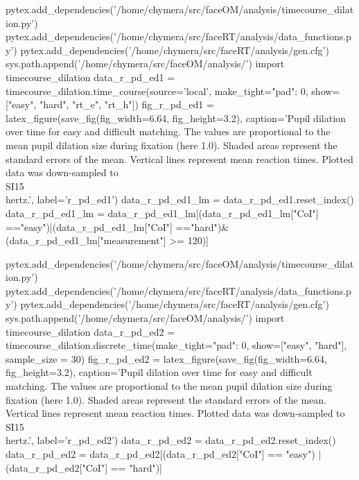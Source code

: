 \begin{pycode}[r_pd_ed1]
pytex.add_dependencies('/home/chymera/src/faceOM/analysis/timecourse_dilation.py')
pytex.add_dependencies('/home/chymera/src/faceRT/analysis/data_functions.py')
pytex.add_dependencies('/home/chymera/src/faceRT/analysis/gen.cfg')
sys.path.append('/home/chymera/src/faceOM/analysis/')
import timecourse_dilation
data_r_pd_ed1 = timecourse_dilation.time_course(source='local', make_tight={"pad": 0}, show=["easy", "hard", "rt_e", "rt_h"])
fig_r_pd_ed1 = latex_figure(save_fig(fig_width=6.64, fig_height=3.2), caption='Pupil dilation over time for easy and difficult matching. The values are proportional to the mean pupil dilation size during fixation (here 1.0). Shaded areas represent the standard errors of the mean. Vertical lines represent mean reaction times. Plotted data was down-sampled to \\SI{15}{\\hertz}.', label='r_pd_ed1')
data_r_pd_ed1_lm = data_r_pd_ed1.reset_index()
data_r_pd_ed1_lm = data_r_pd_ed1_lm[(data_r_pd_ed1_lm["CoI"] =="easy")|(data_r_pd_ed1_lm["CoI"] =="hard")&(data_r_pd_ed1_lm["measurement"] >= 120)]
\end{pycode}
\begin{pycode}[r_pd_ed2]
pytex.add_dependencies('/home/chymera/src/faceOM/analysis/timecourse_dilation.py')
pytex.add_dependencies('/home/chymera/src/faceRT/analysis/data_functions.py')
pytex.add_dependencies('/home/chymera/src/faceRT/analysis/gen.cfg')
sys.path.append('/home/chymera/src/faceOM/analysis/')
import timecourse_dilation
data_r_pd_ed2 = timecourse_dilation.discrete_time(make_tight={"pad": 0}, show=["easy", "hard"], sample_size = 30)
fig_r_pd_ed2 = latex_figure(save_fig(fig_width=6.64, fig_height=3.2), caption='Pupil dilation over time for easy and difficult matching. The values are proportional to the mean pupil dilation size during fixation (here 1.0). Shaded areas represent the standard errors of the mean. Vertical lines represent mean reaction times. Plotted data was down-sampled to \\SI{15}{\\hertz}.', label='r_pd_ed2')
data_r_pd_ed2 = data_r_pd_ed2.reset_index()
data_r_pd_ed2 = data_r_pd_ed2[(data_r_pd_ed2["CoI"] == "easy") | (data_r_pd_ed2["CoI"] == "hard")]
\end{pycode}
